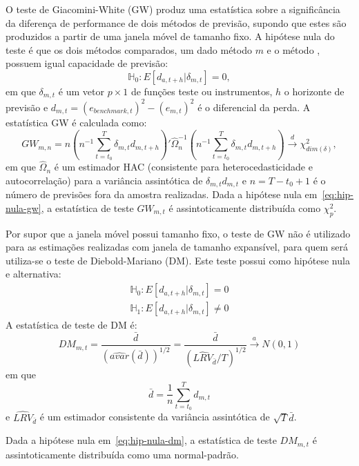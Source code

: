 \documentclass[
	12pt,				%
	openright,			%
	oneside,			%
	a4paper,			%
	english,			%
	brazil				%
	]{dissertacao-ufrgs-abntex2}
\begin{document}
\begin{description}
O teste de Giacomini-White (GW) produz uma estatística sobre a significância da diferença de performance de dois métodos de previsão, supondo que estes são 
produzidos a partir de uma janela móvel de tamanho fixo. A hipótese nula do teste é que os dois métodos comparados, um dado método $m$ e o método \bm, possuem igual capacidade de previsão:
\begin{equation} \label{eq:hip-nula-gw}
\mathbb{H}_0:E[d_{a,t+h}|\delta_{m,t}]=0,
\end{equation}
em que $\delta_{m,t}$ é um vetor $p \times 1$ de funções teste ou instrumentos, $h$ o horizonte de previsão e $d_{m,t}=(e_{benchmark,t})^2 - (e_{m,t})^2$ é o diferencial da perda. A estatística GW é calculada como:
\begin{equation}
GW_{m,n} = n \left( n^{-1} \sum_{t=t_0}^{T} \delta_{m,t} d_{m,t+h} \right)' \hat{\Omega}_n^{-1}	
\left( n^{-1} \sum_{t=t_0}^{T} \delta_{m,t} d_{m,t+h} \right) \overset{d}{\longrightarrow} \chi_{dim(\delta)}^2,
\end{equation}		
em que $\hat{\Omega}_n$ é um estimador HAC (consistente para heterocedasticidade e autocorrelação) para a variância assintótica de $\delta_{m,t} d_{m,t}$ e $n=T-t_0+1$ é o número de previsões fora da amostra realizadas. Dada a hipótese nula em~\ref{eq:hip-nula-gw}, a estatística de teste $GW_{m,t}$ é assintoticamente distribuída como $\chi^2_p$.

Por supor que a janela móvel possui tamanho fixo, o teste de GW não é utilizado para as estimações realizadas com janela de tamanho expansível, para quem será utiliza-se o teste de Diebold-Mariano (DM). Este teste possui como hipótese nula e alternativa:
\begin{equation} \label{eq:hip-nula-dm}
\begin{split}
\mathbb{H}_0:E[d_{a,t+h}|\delta_{m,t}]=0 \\
\mathbb{H}_1:E[d_{a,t+h}|\delta_{m,t}] \neq 0
\end{split}
\end{equation}
A estatística de teste de DM é:
\begin{equation}
DM_{m,t} = \dfrac{\bar{d}}{ \left( \hat{avar}(\bar{d}) \right)^{1/2}} = 
	\dfrac{\bar{d}}{ \left( \hat{LRV}_{\bar{d}} / T \right)^{1/2}} \overset{a}{\longrightarrow} N(0,1)
\end{equation}
em que 
\[ 
\bar{d} = \dfrac{1}{n} \sum_{t=t_0}^T d_{m,t} 
\]
e $\hat{LRV}_{\bar{d}}$ é um estimador consistente da variância assintótica de $\sqrt{T} \bar{d}$.

Dada a hipótese nula em~\ref{eq:hip-nula-dm}, a estatística de teste $DM_{m,t}$ é assintoticamente distribuída como uma normal-padrão.

\end{description}
\end{document}
